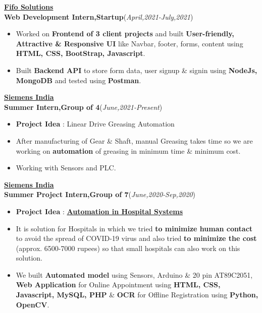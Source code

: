 \documentclass[10pt]{extarticle}
\begin{document}
\vspace{-2pt}
\href{https://www.linkedin.com/company/fifo-solutions/}{\textbf{Fifo Solutions}}\\
\textbf{Web Development Intern,Startup}\hfill\hfill(\textit{April,2021-July,2021})
    \begin{itemize}
        \item Worked on \textbf{Frontend of 3 client projects} and built \textbf{User-friendly, Attractive \& Responsive UI} like Navbar, footer, forms, content using \textbf{HTML, CSS, BootStrap, Javascript}.
        \item Built \textbf{Backend API} to store form data, user signup \& signin using \textbf{NodeJs, MongoDB} and tested using \textbf{Postman}.
    \end{itemize}
\vspace{3pt}
\href{http://www.siemens.com/}{\textbf{Siemens India}}\\
\textbf{Summer Intern,Group of 4}\hfill\hfill(\textit{June,2021-Present})
     \begin{itemize}
         \item \textbf{Project Idea} : Linear Drive Greasing Automation
         \item After manufacturing of Gear \& Shaft, manual Greasing takes time so we are working on \textbf{automation} of greasing in minimum time \& minimum cost.
         \item Working with Sensors and PLC.
     \end{itemize}
\vspace{3pt}
\href{http://www.siemens.com/}{\textbf{Siemens India}}\\
\textbf{Summer Project Intern,Group of 7}\hfill\hfill(\textit{June,2020-Sep,2020})
      \begin{itemize}
          \item \textbf{Project Idea} : \href{https://github.com/PSoni8/Automation-in-Hospital-Systems}{\textbf{Automation in Hospital Systems}}
          \item It is solution for Hospitals in which we tried \textbf{to minimize human contact} to avoid the spread of COVID-19 virus and also tried \textbf{to minimize the cost} (approx. 6500-7000 rupees) so that small hospitals can also work on this solution.
          \item We built \textbf{Automated model} using Sensors, Arduino \& 20 pin AT89C2051, \textbf{Web Application} for Online Appointment using \textbf{ HTML, CSS, Javascript, MySQL, PHP} \& \textbf{OCR} for Offline Registration using \textbf{Python, OpenCV}.
      \end{itemize}
\end{document}
